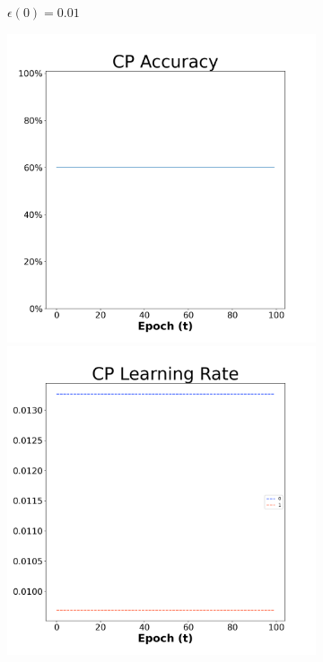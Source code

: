 \begin{figure}[H]
\begin{subfigure}{0.3\textwidth}
  \caption{$\epsilon(0)=0.01$}
\end{subfigure}\hfil %
\begin{subfigure}{0.3\textwidth}
  \includegraphics[width=\linewidth]{images/exper1/NSP/CP_0.03_acc.png}
  \includegraphics[width=\linewidth]{images/exper1/NSP/CP_0.03_lr.png}

\end{subfigure}
\end{figure}
